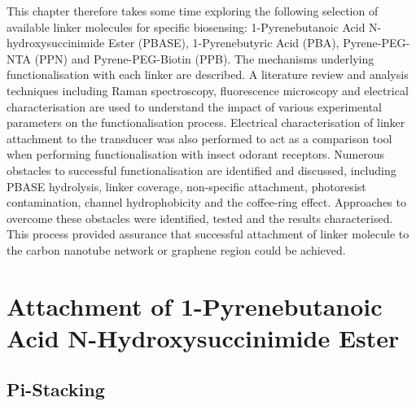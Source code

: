 \documentclass[
  a4paper,
]{scrbook}
\begin{document}
This chapter therefore takes some time exploring the following selection
of available linker molecules for specific biosensing: 1-Pyrenebutanoic
Acid N-hydroxysuccinimide Ester (PBASE), 1-Pyrenebutyric Acid (PBA),
Pyrene-PEG-NTA (PPN) and Pyrene-PEG-Biotin (PPB). The mechanisms
underlying functionalisation with each linker are described. A
literature review and analysis techniques including Raman spectroscopy,
fluorescence microscopy and electrical characterisation are used to
understand the impact of various experimental parameters on the
functionalisation process. Electrical characterisation of linker
attachment to the transducer was also performed to act as a comparison
tool when performing functionalisation with insect odorant receptors.
Numerous obstacles to successful functionalisation are identified and
discussed, including PBASE hydrolysis, linker coverage, non-specific
attachment, photoresist contamination, channel hydrophobicity and the
coffee-ring effect. Approaches to overcome these obstacles were
identified, tested and the results characterised. This process provided
assurance that successful attachment of linker molecule to the carbon
nanotube network or graphene region could be achieved.

\hypertarget{sec-PBASE}{%
\section{Attachment of 1-Pyrenebutanoic Acid N-Hydroxysuccinimide
Ester}\label{sec-PBASE}}

\hypertarget{sec-pi-stacking}{%
\subsection{Pi-Stacking}\label{sec-pi-stacking}}
\end{document}
